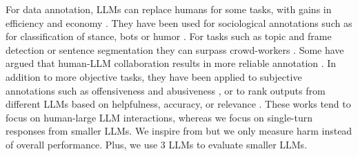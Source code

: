 For data annotation, LLMs
can %
replace humans for some tasks, %
with gains in efficiency and economy \cite{tan2024large}. They have been used for sociological annotations such as for classification of stance, bots or humor  \cite{ziems2024can,zhu2023can}. For tasks such as topic and frame detection or sentence segmentation they can surpass crowd-workers
\cite{he2024if,gilardi2023chatgpt}. Some have argued that human-LLM collaboration results in more reliable annotation \cite{he2024if,zhang2023llmaaa,kim2024meganno+}. In addition to more objective tasks,
they have been applied to subjective annotations such as offensiveness and abusiveness \cite{pavlovic-poesio-2024-effectiveness,zhu2023can,he2023annollm}, %
or to rank outputs from different LLMs based on helpfulness, accuracy, or relevance \cite{zheng2023judging,lin2024wildbench,dubois2024length}. These works tend to focus on human-large LLM interactions, whereas we focus on single-turn responses from smaller LLMs. We inspire from \citet{zheng2023judging} but we only measure harm instead of overall performance. Plus, we use 3 LLMs to evaluate smaller LLMs.